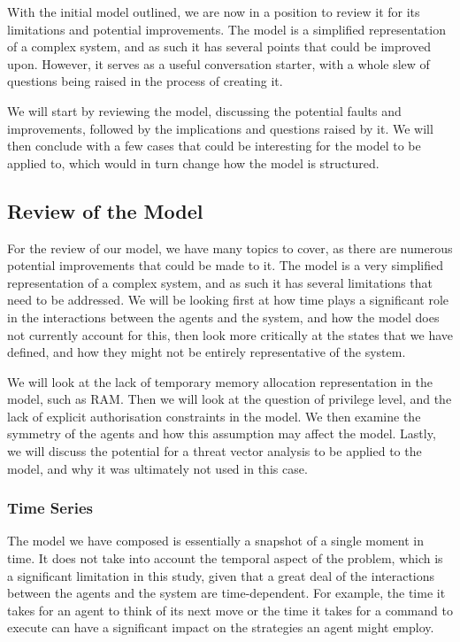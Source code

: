 With the initial model outlined, we are now in a position to review it for its limitations and potential improvements. The model is a simplified representation of a complex system, and as such it has several points that could be improved upon. However, it serves as a useful conversation starter, with a whole slew of questions being raised in the process of creating it.

We will start by reviewing the model, discussing the potential faults and improvements, followed by the implications and questions raised by it. We will then conclude with a few cases that could be interesting for the model to be applied to, which would in turn change how the model is structured.

\subsection{Review of the Model}
\label{ReviewOfModel}

For the review of our model, we have many topics to cover, as there are numerous potential improvements that could be made to it. The model is a very simplified representation of a complex system, and as such it has several limitations that need to be addressed. We will be looking first at how time plays a significant role in the interactions between the agents and the system, and how the model does not currently account for this, then look more critically at the states that we have defined, and how they might not be entirely representative of the system. 

We will look at the lack of temporary memory allocation representation in the model, such as RAM. Then we will look at the question of privilege level, and the lack of explicit authorisation constraints in the model. We then examine the symmetry of the agents and how this assumption may affect the model. Lastly, we will discuss the potential for a threat vector analysis to be applied to the model, and why it was ultimately not used in this case.

\subsubsection{Time Series}
\label{TimeSeries}

The model we have composed is essentially a snapshot of a single moment in time. It does not take into account the temporal aspect of the problem, which is a significant limitation in this study, given that a great deal of the interactions between the agents and the system are time-dependent. For example, the time it takes for an agent to think of its next move or the time it takes for a command to execute can have a significant impact on the strategies an agent might employ.


